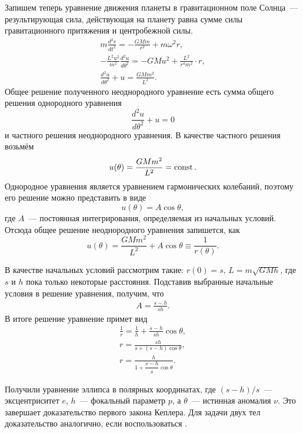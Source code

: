 Запишем теперь уравнение движения планеты в гравитационном поле Солнца~--- результирующая сила, действующая на планету равна сумме силы гравитационного притяжения и центробежной силы.
\begin{gather*}
	m \frac{d^2 r}{d t^2} = - \frac{G M m}{r^2} + m \omega^2 r,\\
	- \frac{L^2	 u^2}{m^2} \frac{d^2 u}{d \theta^2} = - GMu^2 + \frac{L^2}{r^4 m^2} \cdot r,\\
	\frac{d^2 u}{d \theta^2} + u = \frac{GM m^2}{L^2}.
\end{gather*}
Общее решение полученного неоднородного уравнение есть сумма общего решения однородного уравнения 
\begin{equation*}
	\frac{d^2 u}{d \theta^2} + u = 0
\end{equation*}
и частного решения неоднородного уравнения. В качестве частного решения возьмём 
\begin{equation*}
	u(\theta) = \frac{GM m^2}{L^2} = \operatorname{const}.
\end{equation*}
Однородное уравнения является уравнением гармонических колебаний, поэтому его решение можно представить в виде
\begin{equation*}
	u(\theta) = A \cos \theta,	
\end{equation*}
где $A$~--- постоянная интегрирования, определяемая из начальных условий. Отсюда общее решение неоднородного уравнения запишется, как
\begin{equation*}
	u(\theta) = \frac{GM m^2}{L^2} + A \cos \theta \equiv \frac{1}{r(\theta)}.
\end{equation*}

В качестве начальных условий рассмотрим такие: $r(0) = s$, $L = m\sqrt{G M h}$, где $s$ и $h$ пока только некоторые расстояния. Подставив выбранные начальные условия в решение уравнения, получим, что
\begin{gather*}
	A = \frac{s - h}{sh}.
\end{gather*}
В итоге решение уравнение примет вид
\begin{gather*}
	\frac{1}{r} = \frac{1}{h} + \frac{s - h}{sh} \cos \theta,\\
	r = \frac{sh}{s + (s - h) \cos \theta},\\
	r = \frac{h}{1 + \dfrac{s - h}{s} \cos \theta}.
\end{gather*}

Получили уравнение эллипса в полярных координатах, где $(s - h)/s$~--- эксцентриситет $e$, $h$~--- фокальный параметр $p$, а $\theta$~--- истинная аномалия $\nu$. Это завершает доказательство первого закона Кеплера. Для задачи двух тел доказательство аналогично, если воспользоваться .


